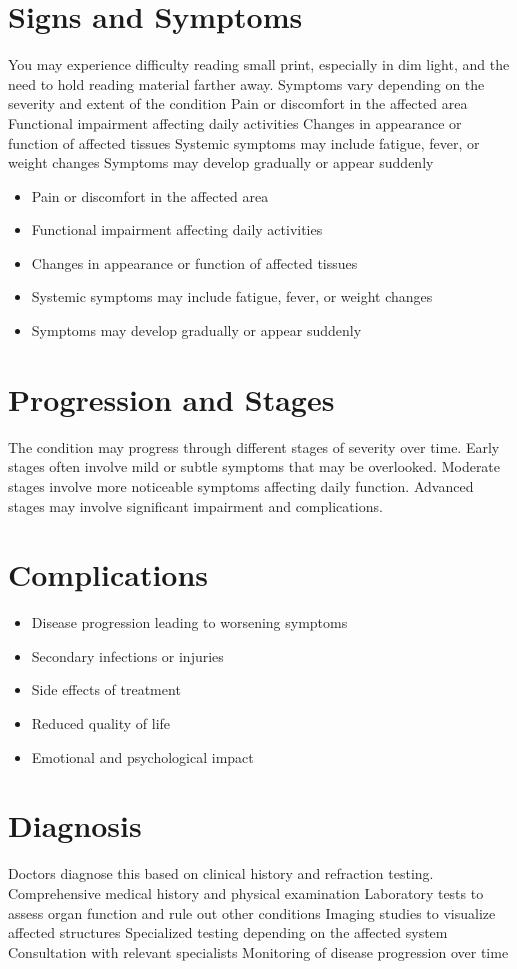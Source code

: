 \section{Signs and Symptoms}
You may experience difficulty reading small print, especially in dim light, and the need to hold reading material farther away. Symptoms vary depending on the severity and extent of the condition Pain or discomfort in the affected area Functional impairment affecting daily activities Changes in appearance or function of affected tissues Systemic symptoms may include fatigue, fever, or weight changes Symptoms may develop gradually or appear suddenly

\begin{itemize}[noitemsep]
  \item Pain or discomfort in the affected area
  \item Functional impairment affecting daily activities
  \item Changes in appearance or function of affected tissues
  \item Systemic symptoms may include fatigue, fever, or weight changes
  \item Symptoms may develop gradually or appear suddenly
\end{itemize}
\section{Progression and Stages}
The condition may progress through different stages of severity over time. Early stages often involve mild or subtle symptoms that may be overlooked. Moderate stages involve more noticeable symptoms affecting daily function. Advanced stages may involve significant impairment and complications.
\section{Complications}
\begin{itemize}[noitemsep]
  \item Disease progression leading to worsening symptoms
  \item Secondary infections or injuries
  \item Side effects of treatment
  \item Reduced quality of life
  \item Emotional and psychological impact
\end{itemize}
\section{Diagnosis}
Doctors diagnose this based on clinical history and refraction testing. Comprehensive medical history and physical examination Laboratory tests to assess organ function and rule out other conditions Imaging studies to visualize affected structures Specialized testing depending on the affected system Consultation with relevant specialists Monitoring of disease progression over time

